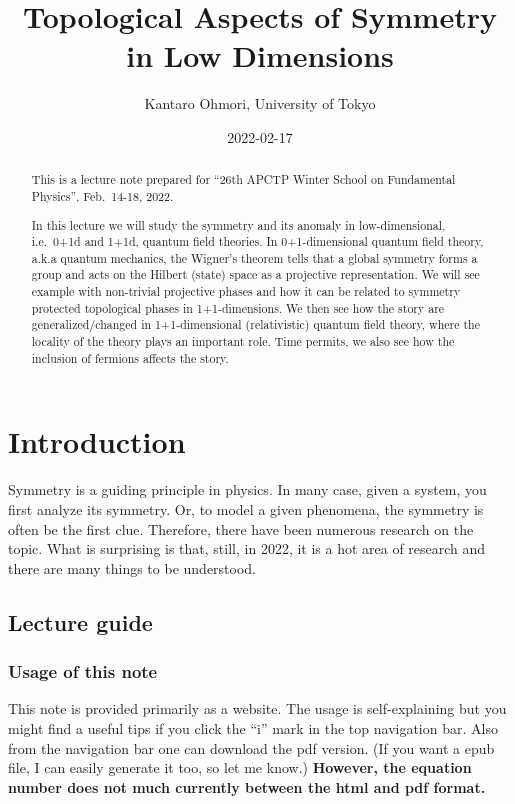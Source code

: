 \documentclass[
]{scrartcl}
\title{Topological Aspects of Symmetry in Low Dimensions}
\author{Kantaro Ohmori, University of Tokyo}
\date{2022-02-17}
\numberwithin{equation}{section}
\theoremstyle{definition}
\theoremstyle{definition}
\theoremstyle{definition}
\theoremstyle{definition}
\theoremstyle{remark}
\begin{document}
\maketitle
\begin{abstract}
This is a lecture note prepared for ``26th APCTP Winter School on Fundamental Physics'', Feb.~14-18, 2022.

In this lecture we will study the symmetry and its anomaly in low-dimensional, i.e.~0+1d and 1+1d, quantum field theories.
In 0+1-dimensional quantum field theory, a.k.a quantum mechanics, the Wigner's theorem tells that a global symmetry forms a group and acts on the Hilbert (state) space as a projective representation. We will see example with non-trivial projective phases and how it can be related to symmetry protected topological phases in 1+1-dimensions. We then see how the story are generalized/changed in 1+1-dimensional (relativistic) quantum field theory, where the locality of the theory plays an important role.
Time permits, we also see how the inclusion of fermions affects the story.
\end{abstract}

{
\setcounter{tocdepth}{2}
\tableofcontents
}
\hypertarget{introduction}{%
\section{Introduction}\label{introduction}}

Symmetry is a guiding principle in physics. In many case, given a system, you first analyze its symmetry. Or, to model a given phenomena, the symmetry is often be the first clue.
Therefore, there have been numerous research on the topic. What is surprising is that, still, in 2022, it is a hot area of research and there are many things to be understood.

\hypertarget{lecture-guide}{%
\subsection{Lecture guide}\label{lecture-guide}}

\hypertarget{usage-of-this-note}{%
\subsubsection{Usage of this note}\label{usage-of-this-note}}

This note is provided primarily as a website.
The usage is self-explaining but you might find a useful tips if you click the ``i'' mark in the top navigation bar. Also from the navigation bar one can download the pdf version. (If you want a epub file, I can easily generate it too, so let me know.) \textbf{However, the equation number does not much currently between the html and pdf format.}
\end{document}
